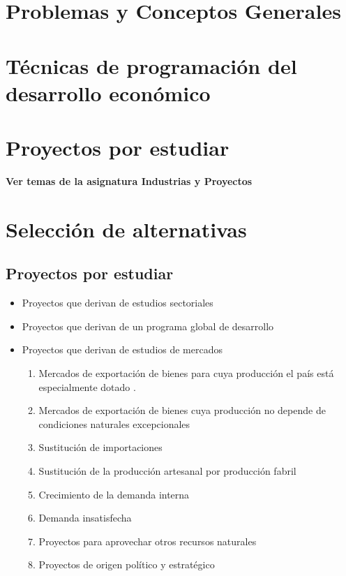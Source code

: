 \documentclass[crop=false]{standalone}
\begin{document}
\section{Problemas y Conceptos Generales}

\section{Técnicas de programación del desarrollo económico}
\blindtext
\section{Proyectos por estudiar}

\textbf{Ver temas de la asignatura Industrias y Proyectos}

\section{Selección de alternativas}
\subsection{Proyectos por estudiar}

\begin{itemize}
    \item Proyectos que derivan de estudios sectoriales
\item  Proyectos que derivan de un programa global de desarrollo
\item  Proyectos que derivan de estudios de mercados
\begin{enumerate}
    \item Mercados de exportación de bienes para cuya producción el país está especialmente dotado .
   \item Mercados de exportación de bienes cuya producción no depende de condiciones naturales excepcionales 
   \item Sustitución de importaciones 
   \item Sustitución de la producción artesanal por producción fabril
   \item Crecimiento de la demanda interna
   \item Demanda insatisfecha 
   \item Proyectos para aprovechar otros recursos naturales
   \item  Proyectos de origen político y estratégico 
\end{enumerate}
 

    
\end{itemize}
\end{document}
